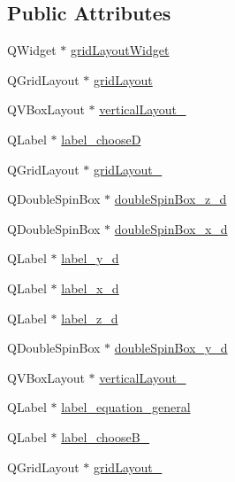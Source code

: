 \subsection*{Public Attributes}
\begin{DoxyCompactItemize}
\item 
Q\+Widget $\ast$ \hyperlink{class_ui___dialog_af56f0c59b650c50a635d4b11890c172e}{grid\+Layout\+Widget}
\item 
Q\+Grid\+Layout $\ast$ \hyperlink{class_ui___dialog_a41336d41594e8776a81d095e8e4ffc61}{grid\+Layout}
\item 
Q\+V\+Box\+Layout $\ast$ \hyperlink{class_ui___dialog_acd165ec013acc890cb290ce16b9563f6}{vertical\+Layout\+\_}
\item 
Q\+Label $\ast$ \hyperlink{class_ui___dialog_aa90f8f5a9ff9c2260913ff6c04e18702}{label\+\_\+chooseD}
\item 
Q\+Grid\+Layout $\ast$ \hyperlink{class_ui___dialog_a95e4393e872e5101ebfc05e5e5cd182f}{grid\+Layout\+\_}
\item 
Q\+Double\+Spin\+Box $\ast$ \hyperlink{class_ui___dialog_af56082e875190dce33551c7b80637f67}{double\+Spin\+Box\+\_\+z\+\_\+d}
\item 
Q\+Double\+Spin\+Box $\ast$ \hyperlink{class_ui___dialog_a979c774889164d711599270126aa7f7a}{double\+Spin\+Box\+\_\+x\+\_\+d}
\item 
Q\+Label $\ast$ \hyperlink{class_ui___dialog_a6dfc56c2ed0c6f1141dddb9ce6ce65f7}{label\+\_\+y\+\_\+d}
\item 
Q\+Label $\ast$ \hyperlink{class_ui___dialog_a24bc1d94076a61c599e0626cce0ecbff}{label\+\_\+x\+\_\+d}
\item 
Q\+Label $\ast$ \hyperlink{class_ui___dialog_a680efd605623366cfbd396c56bfe8fbd}{label\+\_\+z\+\_\+d}
\item 
Q\+Double\+Spin\+Box $\ast$ \hyperlink{class_ui___dialog_a81747c4db62ac24a132abe8cf5270405}{double\+Spin\+Box\+\_\+y\+\_\+d}
\item 
Q\+V\+Box\+Layout $\ast$ \hyperlink{class_ui___dialog_a4fb6d1c8d4780f0d513f4a48af4a2b10}{vertical\+Layout\+\_}
\item 
Q\+Label $\ast$ \hyperlink{class_ui___dialog_afdb95c03e64a971906bad7a49fbb887f}{label\+\_\+equation\+\_\+general}
\item 
Q\+Label $\ast$ \hyperlink{class_ui___dialog_a71bdeed53adf9ef8db30eb55a879864a}{label\+\_\+choose\+B\+\_}
\item 
Q\+Grid\+Layout $\ast$ \hyperlink{class_ui___dialog_af3de0f6556fd8c9d0aac09a2f90d92b9}{grid\+Layout\+\_}

\end{DoxyCompactItemize}
